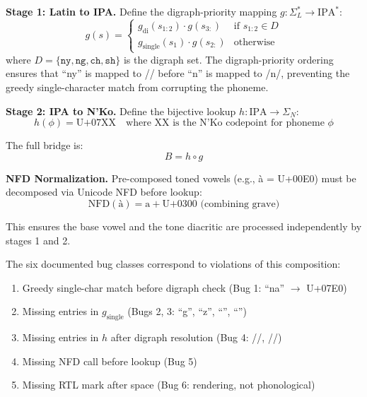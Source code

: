\documentclass[11pt]{article}
\theoremstyle{remark}
\begin{document}
\textbf{Stage 1: Latin to IPA.} Define the digraph-priority mapping $g: \Sigma_L^* \to \text{IPA}^*$:
\begin{equation}
g(s) = \begin{cases}
g_{\text{di}}(s_{1:2}) \cdot g(s_{3:}) & \text{if } s_{1:2} \in D \\
g_{\text{single}}(s_1) \cdot g(s_{2:}) & \text{otherwise}
\end{cases}
\end{equation}
where $D = \{\texttt{ny}, \texttt{ng}, \texttt{ch}, \texttt{sh}\}$ is the digraph set. The digraph-priority ordering ensures that ``ny'' is mapped to // before ``n'' is mapped to /n/, preventing the greedy single-character match from corrupting the phoneme.

\textbf{Stage 2: IPA to N'Ko.} Define the bijective lookup $h: \text{IPA} \to \Sigma_N$:
\begin{equation}
h(\phi) = \text{U+07XX} \quad \text{where XX is the N'Ko codepoint for phoneme } \phi
\end{equation}

The full bridge is:
\begin{equation}
B = h \circ g
\end{equation}

\textbf{NFD Normalization.} Pre-composed toned vowels (e.g., \`{a} = U+00E0) must be decomposed via Unicode NFD before lookup:
\begin{equation}
\text{NFD}(\text{\`{a}}) = \text{a} + \text{U+0300 (combining grave)}
\end{equation}

This ensures the base vowel and the tone diacritic are processed independently by stages 1 and 2.

The six documented bug classes correspond to violations of this composition:
\begin{enumerate}
\item Greedy single-char match before digraph check (Bug 1: ``na'' $\to$ U+07E0)
\item Missing entries in $g_{\text{single}}$ (Bugs 2, 3: ``g'', ``z'', ``'', ``'')
\item Missing entries in $h$ after digraph resolution (Bug 4: //, //)
\item Missing NFD call before lookup (Bug 5)
\item Missing RTL mark after space (Bug 6: rendering, not phonological)
\end{enumerate}
\end{document}
